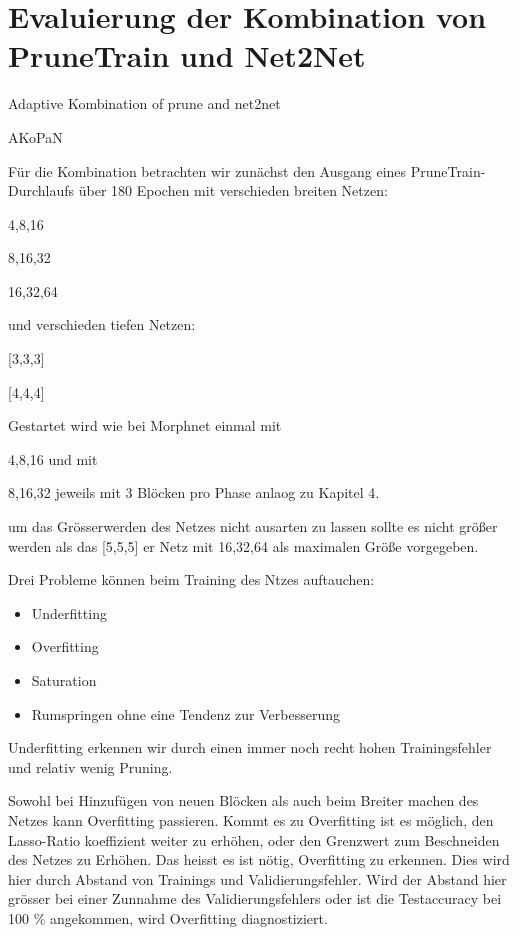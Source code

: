 \color{black}
\chapter{Evaluierung der Kombination von PruneTrain und Net2Net }\label{sec:ptpnet2net}
Adaptive Kombination of prune and net2net

AKoPaN

Für die Kombination betrachten wir zunächst den Ausgang eines PruneTrain-Durchlaufs über 180 Epochen mit verschieden breiten Netzen:

4,8,16


8,16,32


16,32,64


und verschieden tiefen Netzen:

[3,3,3]


[4,4,4]




Gestartet wird wie bei Morphnet einmal mit 


4,8,16 und mit 


8,16,32
jeweils mit 3 Blöcken pro Phase
anlaog zu Kapitel 4.


um das Grösserwerden des Netzes nicht ausarten zu lassen sollte es nicht größer werden als 
das [5,5,5] er Netz mit 16,32,64 als maximalen Größe vorgegeben.




Drei Probleme können beim Training des Ntzes auftauchen:
\begin{itemize}
 \item Underfitting
 \item Overfitting
 \item Saturation
 \item Rumspringen ohne eine Tendenz zur Verbesserung
\end{itemize}

Underfitting erkennen wir durch einen immer noch recht hohen Trainingsfehler und relativ wenig Pruning.


Sowohl bei Hinzufügen von neuen Blöcken als auch beim Breiter machen des Netzes kann Overfitting passieren. Kommt es zu Overfitting ist es möglich, den Lasso-Ratio koeffizient weiter zu erhöhen, oder den Grenzwert zum Beschneiden des Netzes zu Erhöhen. Das heisst es ist nötig, Overfitting zu erkennen. Dies wird hier durch Abstand von Trainings und Validierungsfehler. Wird der Abstand hier grösser bei einer Zunnahme des Validierungsfehlers oder  ist die Testaccuracy bei 100 \% angekommen, wird Overfitting diagnostiziert.


